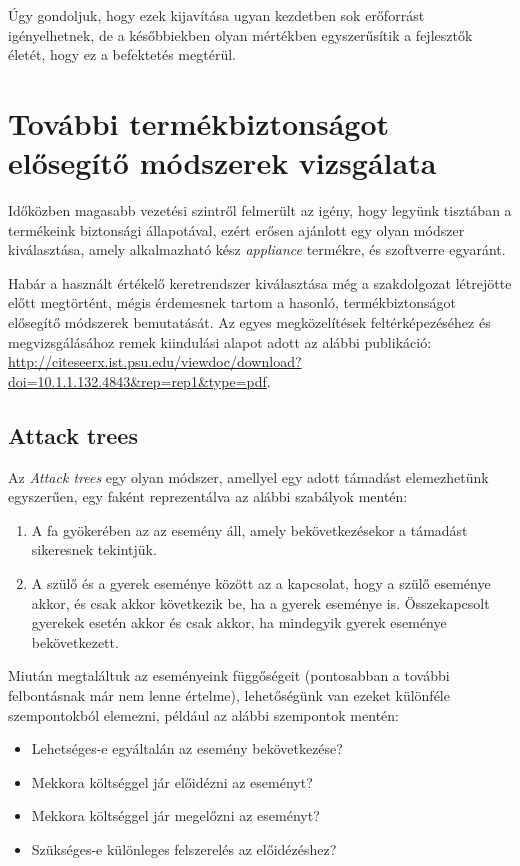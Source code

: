 Úgy gondoljuk, hogy ezek kijavítása ugyan kezdetben sok erőforrást igényelhetnek, de a későbbiekben
olyan mértékben egyszerűsítik a fejlesztők életét, hogy ez a befektetés megtérül.

\section{További termékbiztonságot elősegítő módszerek vizsgálata}

Időközben magasabb vezetési szintről felmerült az igény, hogy legyünk tisztában a termékeink
biztonsági állapotával, ezért erősen ajánlott egy olyan módszer kiválasztása, amely alkalmazható
kész \emph{appliance} termékre, és szoftverre egyaránt.

Habár a használt értékelő keretrendszer kiválasztása még a szakdolgozat létrejötte előtt megtörtént,
mégis érdemesnek tartom a hasonló, termékbiztonságot elősegítő módszerek bemutatását. Az egyes
megközelítések feltérképezéséhez és megvizsgálásához remek kiindulási alapot adott az alábbi
publikáció:
\url{http://citeseerx.ist.psu.edu/viewdoc/download?doi=10.1.1.132.4843&rep=rep1&type=pdf}.

\subsection{Attack trees}

Az \emph{Attack trees} egy olyan módszer, amellyel egy adott támadást elemezhetünk egyszerűen, egy
faként reprezentálva az alábbi szabályok mentén:
\begin{enumerate}
    \item A fa gyökerében az az esemény áll, amely bekövetkezésekor a támadást sikeresnek tekintjük.
    \item A szülő és a gyerek eseménye között az a kapcsolat, hogy a szülő eseménye akkor, és csak
        akkor következik be, ha a gyerek eseménye is.  Összekapcsolt gyerekek esetén akkor és csak
        akkor, ha mindegyik gyerek eseménye bekövetkezett.
\end{enumerate}
Miután megtaláltuk az eseményeink függőségeit (pontosabban a további felbontásnak már nem lenne
értelme), lehetőségünk van ezeket különféle szempontokból elemezni, például az alábbi szempontok
mentén:
\begin{itemize}
    \item Lehetséges-e egyáltalán az esemény bekövetkezése?
    \item Mekkora költséggel jár előidézni az eseményt?
    \item Mekkora költséggel jár megelőzni az eseményt?
    \item Szükséges-e különleges felszerelés az előidézéshez?
\end{itemize}


